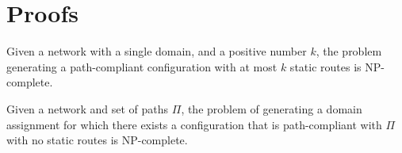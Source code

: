 \section{Proofs}
\begin{theorem}
\label{thm:ospfsynth}
Given a
network with a single domain,
and a positive number $k$,
the problem generating
a path-compliant configuration with at most $k$ static routes
is NP-complete.
\end{theorem}


\begin{theorem}
\label{thm:multidom}
	Given a
	network and  set of paths  $\Pi$,
	the problem of generating a domain assignment for which
	there exists a 
	configuration that is path-compliant with $\Pi$ with no static routes
	is NP-complete.
\end{theorem}

